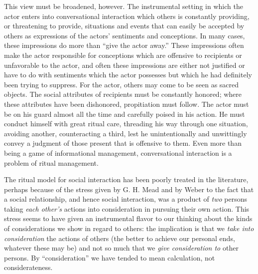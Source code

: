 \documentclass[openany,nobib]{tufte-book}
\begin{document}
This view must be broadened, however. The instrumental setting in which
the actor enters into conversational interaction which others is
constantly providing, or threatening to provide, situations and events
that can easily be accepted by others as expressions of the actors'
sentiments and conceptions. In many cases, these impressions do more
than ``give the actor away.'' These impressions often make the actor
responsible for conceptions which are offensive to recipients or
unfavorable to the actor, and often these impressions are either not
justified or have to do with sentiments which the actor possesses but
which he had definitely been trying to suppress. For the actor, others
may come to be seen as sacred objects. The social attributes of
recipients must be constantly honored; where these attributes have been
dishonored, propitiation must follow. The actor must be on his guard
almost all the time and carefully poised in his action. He must conduct
himself with great ritual care, threading his way through one situation,
avoiding another, counteracting a third, lest he unintentionally and
unwittingly convey a judgment of those present that is offensive to
them. Even more than being a game of informational management,
conversational interaction is a problem of ritual management.

The ritual model for social interaction has been poorly treated in the
literature, perhaps because of the stress given by G. H. Mead and by
Weber to the fact that a social relationship, and hence social
interaction, was a product of \emph{two} persons taking \emph{each
other's} actions into consideration in pursuing their own action. This
stress seems to have given an instrumental flavor to our thinking about
the kinds of considerations we show in regard to others: the implication
is that we \emph{take into consideration} the actions of others (the
better to achieve our personal ends, whatever these may be) and not so
much that we \emph{give consideration to} other persons. By
``consideration'' we have tended to mean calculation, not
considerateness.
\end{document}

